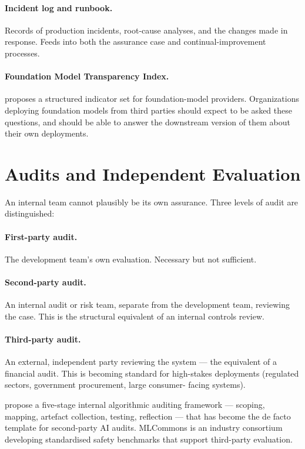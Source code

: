 \paragraph{Incident log and runbook.} Records of production
incidents, root-cause analyses, and the changes made in response.
Feeds into both the assurance case and continual-improvement
processes.

\paragraph{Foundation Model Transparency Index.}
\citet{bommasani2023transparency} proposes a structured
indicator set for foundation-model providers. Organizations
deploying foundation models from third parties should expect to
be asked these questions, and should be able to answer the
downstream version of them about their own deployments.

\section{Audits and Independent Evaluation}

An internal team cannot plausibly be its own assurance. Three
levels of audit are distinguished:

\paragraph{First-party audit.} The development team's own
evaluation. Necessary but not sufficient.

\paragraph{Second-party audit.} An internal audit or risk team,
separate from the development team, reviewing the case. This is
the structural equivalent of an internal controls review.

\paragraph{Third-party audit.} An external, independent party
reviewing the system --- the equivalent of a financial audit.
This is becoming standard for high-stakes deployments
(regulated sectors, government procurement, large consumer-
facing systems).

\citet{raji2020closing} propose a five-stage internal
algorithmic auditing framework --- scoping, mapping, artefact
collection, testing, reflection --- that has become the
de facto template for second-party AI audits. MLCommons
\citep{mlcommons_ailuminate} is an industry consortium
developing standardised safety benchmarks that support
third-party evaluation.

